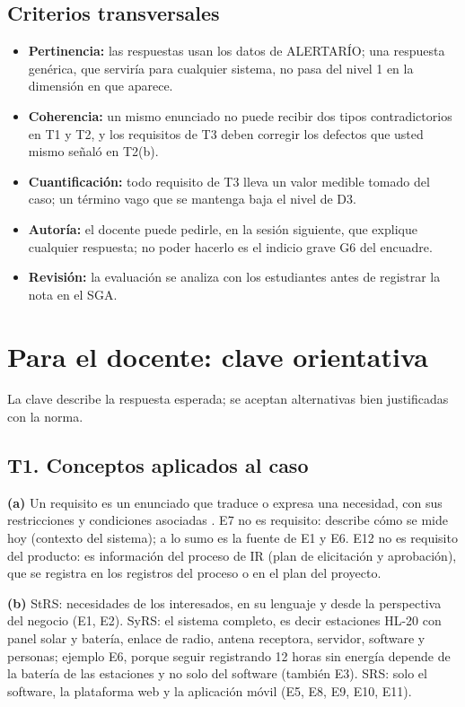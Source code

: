 \documentclass[11pt]{article}
\newif\ifclave
\newcommand{\seccion}[1]{\section{\textcolor{utegreendk}{#1}}}
\newcommand{\subseccion}[1]{\subsection{\textcolor{midblue}{#1}}}
\begin{document}
\subseccion{Criterios transversales}

\begin{itemize}[leftmargin=18pt,itemsep=2pt]
	\item \textbf{Pertinencia:} las respuestas usan los datos de ALERTARÍO; una respuesta genérica, que serviría para cualquier sistema, no pasa del nivel 1 en la dimensión en que aparece.
	\item \textbf{Coherencia:} un mismo enunciado no puede recibir dos tipos contradictorios en T1 y T2, y los requisitos de T3 deben corregir los defectos que usted mismo señaló en T2(b).
	\item \textbf{Cuantificación:} todo requisito de T3 lleva un valor medible tomado del caso; un término vago que se mantenga baja el nivel de D3.
	\item \textbf{Autoría:} el docente puede pedirle, en la sesión siguiente, que explique cualquier respuesta; no poder hacerlo es el indicio grave G6 del encuadre.
	\item \textbf{Revisión:} la evaluación se analiza con los estudiantes antes de registrar la nota en el SGA.
\end{itemize}

\ifclave
\newpage
\seccion{Para el docente: clave orientativa}

La clave describe la respuesta esperada; se aceptan alternativas bien justificadas con la norma.

\subseccion{T1. Conceptos aplicados al caso}

\textbf{(a)} Un requisito es un enunciado que traduce o expresa una necesidad, con sus restricciones y condiciones asociadas \citep{iso29148_2018}. E7 no es requisito: describe cómo se mide hoy (contexto del sistema); a lo sumo es la fuente de E1 y E6. E12 no es requisito del producto: es información del proceso de IR (plan de elicitación y aprobación), que se registra en los registros del proceso o en el plan del proyecto.

\textbf{(b)} StRS: necesidades de los interesados, en su lenguaje y desde la perspectiva del negocio (E1, E2). SyRS: el sistema completo, es decir estaciones HL-20 con panel solar y batería, enlace de radio, antena receptora, servidor, software y personas; ejemplo E6, porque seguir registrando 12 horas sin energía depende de la batería de las estaciones y no solo del software (también E3). SRS: solo el software, la plataforma web y la aplicación móvil (E5, E8, E9, E10, E11).
\end{document}
